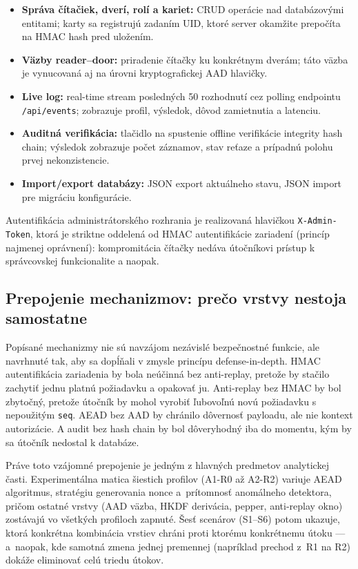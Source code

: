 \documentclass[journal,a4paper,onecolumn]{IEEEtran}
\begin{document}
\begin{itemize}[leftmargin=*,itemsep=2pt]
  \item \textbf{Správa čítačiek, dverí, rolí a kariet:} CRUD operácie nad databázovými entitami; karty sa registrujú zadaním UID, ktoré server okamžite prepočíta na HMAC hash pred uložením.
  \item \textbf{Väzby reader--door:} priradenie čítačky ku konkrétnym dverám; táto väzba je vynucovaná aj na úrovni kryptografickej AAD hlavičky.
  \item \textbf{Live log:} real-time stream posledných 50 rozhodnutí cez polling endpointu \texttt{/api/events}; zobrazuje profil, výsledok, dôvod zamietnutia a latenciu.
  \item \textbf{Auditná verifikácia:} tlačidlo na spustenie offline verifikácie integrity hash chain; výsledok zobrazuje počet záznamov, stav reťaze a prípadnú polohu prvej nekonzistencie.
  \item \textbf{Import/export databázy:} JSON export aktuálneho stavu, JSON import pre migráciu konfigurácie.
\end{itemize}

Autentifikácia administrátorského rozhrania je realizovaná hlavičkou \texttt{X-Admin-Token}, ktorá je striktne oddelená od HMAC autentifikácie zariadení (princíp najmenej oprávnení\cite{SaltzerSchroeder1975}): kompromitácia čítačky nedáva útočníkovi prístup k správcovskej funkcionalite a naopak.

\subsection{Prepojenie mechanizmov: prečo vrstvy nestoja samostatne}

Popísané mechanizmy nie sú navzájom nezávislé bezpečnostné funkcie, ale navrhnuté tak, aby sa dopĺňali v zmysle princípu defense-in-depth\cite{DefenseInDepth,NIST80053}. HMAC autentifikácia zariadenia by bola neúčinná bez anti-replay, pretože by stačilo zachytiť jednu platnú požiadavku a opakovať ju. Anti-replay bez HMAC by bol zbytočný, pretože útočník by mohol vyrobiť ľubovoľnú novú požiadavku s nepoužitým \texttt{seq}. AEAD bez AAD by chránilo dôvernosť payloadu, ale nie kontext autorizácie. A audit bez hash chain by bol dôveryhodný iba do momentu, kým by sa útočník nedostal k databáze.

Práve toto vzájomné prepojenie je jedným z hlavných predmetov analytickej časti. Experimentálna matica šiestich profilov (A1-R0 až A2-R2) variuje AEAD algoritmus, stratégiu generovania nonce a~prítomnosť anomálneho detektora, pričom ostatné vrstvy (AAD väzba, HKDF derivácia, pepper, anti-replay okno) zostávajú vo všetkých profiloch zapnuté. Šesť scenárov (S1--S6) potom ukazuje, ktorá konkrétna kombinácia vrstiev chráni proti ktorému konkrétnemu útoku --- a~naopak, kde samotná zmena jednej premennej (napríklad prechod z~R1 na R2) dokáže eliminovať celú triedu útokov.
\end{document}

